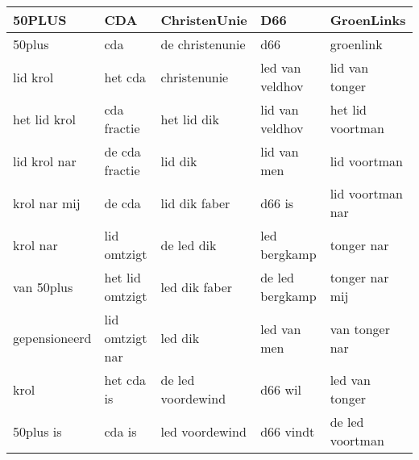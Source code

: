 \begin{tabular}{lllll}
\toprule
        50PLUS &              CDA &       ChristenUnie &              D66 &        GroenLinks \\
\midrule
        50plus &              cda &    de christenunie &              d66 &         groenlink \\
      lid krol &          het cda &       christenunie &  led van veldhov &    lid van tonger \\
  het lid krol &      cda fractie &        het lid dik &  lid van veldhov &  het lid voortman \\
  lid krol nar &   de cda fractie &            lid dik &      lid van men &      lid voortman \\
  krol nar mij &           de cda &      lid dik faber &           d66 is &  lid voortman nar \\
      krol nar &      lid omtzigt &         de led dik &     led bergkamp &        tonger nar \\
    van 50plus &  het lid omtzigt &      led dik faber &  de led bergkamp &    tonger nar mij \\
 gepensioneerd &  lid omtzigt nar &            led dik &      led van men &    van tonger nar \\
          krol &       het cda is &  de led voordewind &          d66 wil &    led van tonger \\
     50plus is &           cda is &     led voordewind &        d66 vindt &   de led voortman \\
\bottomrule
\end{tabular}
